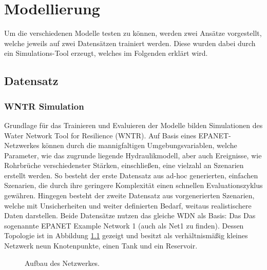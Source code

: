 \chapter{Modellierung \label{Chapter-Methods}}

Um die verschiedenen Modelle testen zu können, werden zwei Ansätze vorgestellt, welche jeweils auf zwei Datensätzen
 trainiert werden. Diese wurden dabei durch ein Simulations-Tool erzeugt, welches im Folgenden erklärt wird.

\section{Datensatz}

\subsection*{WNTR Simulation}

Grundlage für das Trainieren und Evaluieren der Modelle bilden Simulationen des Water Network Tool for Resilience
 (WNTR). Auf Basis eines EPANET-Netzwerkes können durch die mannigfaltigen Umgebungsvariablen, welche Parameter,
 wie das zugrunde liegende Hydraulikmodell, aber auch Ereignisse, wie Rohrbrüche verschiedenster Stärken,
 einschließen, eine vielzahl an Szenarien erstellt werden. So besteht der erste Datensatz aus ad-hoc generierten, 
 einfachen Szenarien, die durch ihre geringere Komplexität einen schnellen Evaluationszyklus gewähren. Hingegen
 besteht der zweite Datensatz aus vorgenerierten Szenarien, welche mit Unsicherheiten und weiter definierten
 Bedarf, weitaus realistischere Daten darstellen. Beide Datensätze nutzen das gleiche WDN als Basis: Das Das
 sogenannte EPANET Example Network 1 (auch als Net1 zu finden). Dessen Topologie ist in Abbildung
 \ref{fig:practice-wdn} gezeigt und besitzt als verhältnismäßig kleines Netzwerk neun Knotenpunkte, einen Tank
 und ein Reservoir.

\begin{figure}
    \centering
    \caption{Aufbau des Netzwerkes.}
    \label{fig:practice-wdn}
\end{figure}

